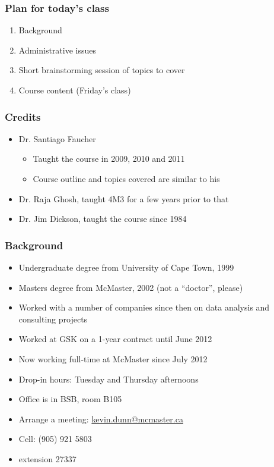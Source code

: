 
\begin{frame}\frametitle{Plan for today's class}
	\begin{enumerate}
		\item	Background
		\item	Administrative issues
		\item	Short brainstorming session of topics to cover
		\item	Course content (Friday's class)
	\end{enumerate}
\end{frame}

\begin{frame}\frametitle{Credits}
	
	\begin{itemize}
		\item	Dr. Santiago Faucher
		\begin{itemize}
			\item	Taught the course in 2009, 2010 and 2011
			\item	Course outline and topics covered are similar to his
		\end{itemize}
		\item	Dr. Raja Ghosh, taught 4M3 for a few years prior to that
		\item	Dr. Jim Dickson, taught the course since 1984
	\end{itemize}	
\end{frame}

\begin{frame}\frametitle{Background}
	{\color{myGreen}{About myself}}
	\begin{itemize}
		\item	Undergraduate degree from University of Cape Town, 1999
		\item	Masters degree from McMaster, 2002 (not a ``doctor'', please)
		\item	Worked with a number of companies since then on data analysis and consulting projects
		\item	Worked at GSK on a 1-year contract until June 2012		
		\item	Now working full-time at McMaster since July 2012
		\item	Drop-in hours: Tuesday and Thursday afternoons
		\item	Office is in BSB, room B105
		\item	Arrange a meeting: \url{kevin.dunn@mcmaster.ca}
		\item	Cell: (905) 921 5803
		\item	extension 27337
	\end{itemize}	
\end{frame}

